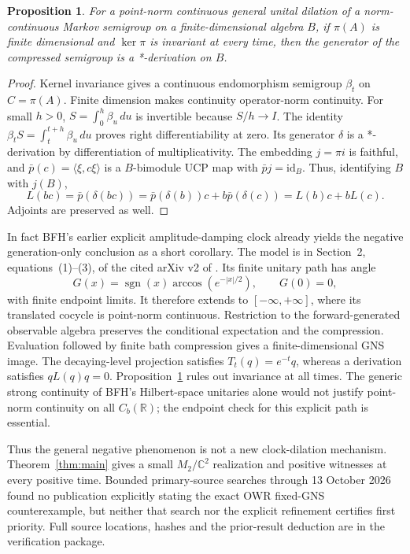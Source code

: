 \documentclass[11pt]{article}
\newtheorem{proposition}[theorem]{Proposition}
\newcommand{\C}{\mathbb C}
\newcommand{\R}{\mathbb R}
\begin{document}
\begin{proposition}\label{prop:finite}
For a point-norm continuous general unital dilation of a norm-continuous
Markov semigroup on a finite-dimensional algebra $B$, if $\pi(A)$ is
finite dimensional and $\ker\pi$ is invariant at every time, then the
generator of the compressed semigroup is a *-derivation on $B$.
\end{proposition}
\begin{proof}
Kernel invariance gives a continuous endomorphism semigroup $\beta_t$
on $C=\pi(A)$. Finite dimension makes continuity operator-norm
continuity. For small $h>0$, $S=\int_0^h\beta_u\,du$ is invertible
because $S/h\to I$. The identity
$\beta_tS=\int_t^{t+h}\beta_u\,du$ proves right differentiability
at zero. Its generator $\delta$ is a *-derivation by differentiation
of multiplicativity. The embedding $j=\pi i$ is faithful, and
$\bar p(c)=\langle\xi,c\xi\rangle$ is a $B$-bimodule UCP map
with $\bar p j=\mathrm{id}_B$. Thus, identifying $B$ with $j(B)$,
\[
 L(bc)=\bar p(\delta(bc))=\bar p(\delta(b))c+b\bar p(\delta(c))
       =L(b)c+bL(c).
\]
Adjoints are preserved as well.
\end{proof}

In fact BFH's earlier explicit amplitude-damping clock already yields
the negative generation-only conclusion as a short corollary. The model
is in Section~2, equations~(1)--(3), of the cited arXiv v2 of \cite{bfh}.
Its finite unitary path has angle
\[
 G(x)=\operatorname{sgn}(x)\arccos(e^{-|x|/2}),\qquad G(0)=0,
\]
with finite endpoint limits.
It therefore extends to $[-\infty,+\infty]$, where its translated
cocycle is point-norm continuous. Restriction to the forward-generated
observable algebra preserves the conditional expectation and the
compression. Evaluation followed by finite bath compression gives a
finite-dimensional GNS image. The decaying-level projection satisfies
$T_t(q)=e^{-t}q$, whereas a derivation satisfies $qL(q)q=0$.
Proposition~\ref{prop:finite} rules out invariance at all times.
The generic strong continuity of BFH's Hilbert-space unitaries alone
would not justify point-norm continuity on all $C_b(\R)$; the endpoint
check for this explicit path is essential.

Thus the general negative phenomenon is not a new clock-dilation
mechanism. Theorem~\ref{thm:main} gives a small $M_2/\C^2$ realization
and positive witnesses at every positive time. Bounded primary-source
searches through 13 October 2026 found no publication explicitly stating
the exact OWR fixed-GNS counterexample, but neither that search nor the
explicit refinement certifies first priority. Full source locations,
hashes and the prior-result deduction are in the verification package.
\end{document}

